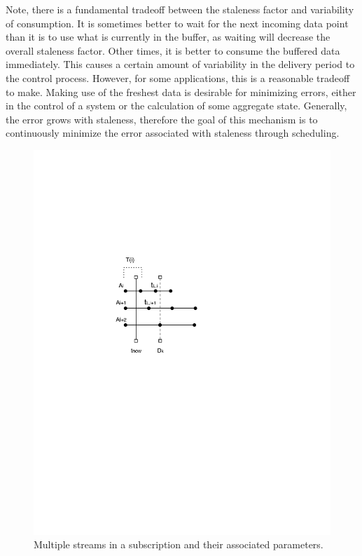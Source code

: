Note, there is a fundamental tradeoff
between the staleness factor and variability of consumption.  It is sometimes better to wait for the next incoming data point than it is to use what
is currently in the buffer, as waiting will decrease the overall staleness factor.  Other times, it is better to consume the buffered data immediately.
This causes a certain amount of variability in the delivery period to the control process.  However, for some applications, this is a reasonable tradeoff
to make.  Making use of the freshest data is desirable for minimizing errors, either in the control of a system or the calculation of some aggregate 
state.
Generally, the error grows with staleness, therefore the goal of this mechanism is to continuously minimize the error associated with staleness through
scheduling.


\begin{figure}[t!] %
\centering
\includegraphics[width=0.75\columnwidth]{figs/min_buffer}
\caption{Multiple streams in a subscription and their associated parameters.}
\label{fig:min_buffer}
\end{figure}

